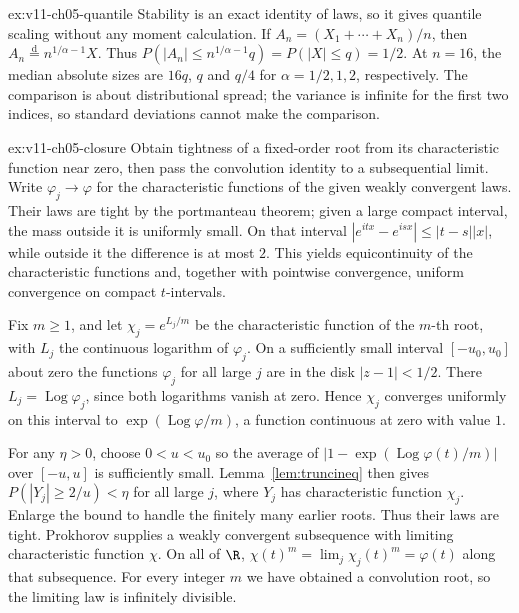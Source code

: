 \begin{solution}{ex:v11-ch05-quantile}
\idea Stability is an exact identity of laws, so it gives quantile scaling without any moment calculation.
\writeup If $A_n=(X_1+\cdots+X_n)/n$, then $A_n\overset{\mathrm d}=n^{1/\alpha-1}X$. Thus $P(|A_n|\le n^{1/\alpha-1}q)=P(|X|\le q)=1/2$. At $n=16$, the median absolute sizes are $16q$, $q$ and $q/4$ for $\alpha=1/2,1,2$, respectively. The comparison is about distributional spread; the variance is infinite for the first two indices, so standard deviations cannot make the comparison.
\end{solution}

\begin{solution}{ex:v11-ch05-closure}
\idea Obtain tightness of a fixed-order root from its characteristic function near zero, then pass the convolution identity to a subsequential limit.
\writeup Write $\varphi_j\to\varphi$ for the characteristic functions of the given weakly convergent laws. Their laws are tight by the portmanteau theorem; given a large compact interval, the mass outside it is uniformly small. On that interval $|e^{itx}-e^{isx}|\le |t-s||x|$, while outside it the difference is at most $2$. This yields equicontinuity of the characteristic functions and, together with pointwise convergence, uniform convergence on compact $t$-intervals.

Fix $m\ge1$, and let $\chi_j=e^{L_j/m}$ be the characteristic function of the $m$-th root, with $L_j$ the continuous logarithm of $\varphi_j$. On a sufficiently small interval $[-u_0,u_0]$ about zero the functions $\varphi_j$ for all large $j$ are in the disk $|z-1|<1/2$. There $L_j=\operatorname{Log}\varphi_j$, since both logarithms vanish at zero. Hence $\chi_j$ converges uniformly on this interval to $\exp(\operatorname{Log}\varphi/m)$, a function continuous at zero with value $1$.

For any $\eta>0$, choose $0<u<u_0$ so the average of $|1-\exp(\operatorname{Log}\varphi(t)/m)|$ over $[-u,u]$ is sufficiently small. Lemma~\ref{lem:truncineq} then gives $P(|Y_j|\ge2/u)<\eta$ for all large $j$, where $Y_j$ has characteristic function $\chi_j$. Enlarge the bound to handle the finitely many earlier roots. Thus their laws are tight. Prokhorov supplies a weakly convergent subsequence with limiting characteristic function $\chi$. On all of $\R$, $\chi(t)^m=\lim_j\chi_j(t)^m=\varphi(t)$ along that subsequence. For every integer $m$ we have obtained a convolution root, so the limiting law is infinitely divisible.
\end{solution}

